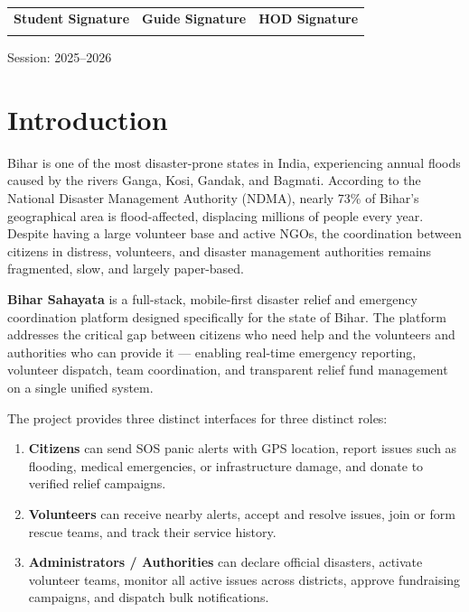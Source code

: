 \documentclass[12pt,a4paper]{article}
\begin{document}
\begin{titlepage}
\vfill

\begin{tabular}{@{}L{5cm} L{5cm} L{4cm}}
\textbf{Student Signature} & \textbf{Guide Signature} & \textbf{HOD Signature} \\[1.4cm]
\underline{\hspace{4cm}} & \underline{\hspace{4cm}} & \underline{\hspace{3cm}} \\
\end{tabular}

\vspace{1cm}
{\small Session: 2025--2026}
\end{titlepage}

\setcounter{page}{1}
\onehalfspacing

\section{Introduction}

Bihar is one of the most disaster-prone states in India, experiencing
annual floods caused by the rivers Ganga, Kosi, Gandak, and Bagmati.
According to the National Disaster Management Authority (NDMA), nearly
73\% of Bihar's geographical area is flood-affected, displacing millions
of people every year. Despite having a large volunteer base and active
NGOs, the coordination between citizens in distress, volunteers, and
disaster management authorities remains fragmented, slow, and largely
paper-based.

\textbf{Bihar Sahayata} is a full-stack, mobile-first disaster relief and
emergency coordination platform designed specifically for the state of Bihar.
The platform addresses the critical gap between citizens who need help and
the volunteers and authorities who can provide it --- enabling real-time
emergency reporting, volunteer dispatch, team coordination, and transparent
relief fund management on a single unified system.

The project provides three distinct interfaces for three distinct roles:

\begin{enumerate}[leftmargin=*, label=\textbf{\arabic*.}, itemsep=3pt]
  \item \textbf{Citizens} can send SOS panic alerts with GPS location,
        report issues such as flooding, medical emergencies, or infrastructure
        damage, and donate to verified relief campaigns.
  \item \textbf{Volunteers} can receive nearby alerts, accept and resolve
        issues, join or form rescue teams, and track their service history.
  \item \textbf{Administrators / Authorities} can declare official disasters,
        activate volunteer teams, monitor all active issues across districts,
        approve fundraising campaigns, and dispatch bulk notifications.
\end{enumerate}
\end{document}
